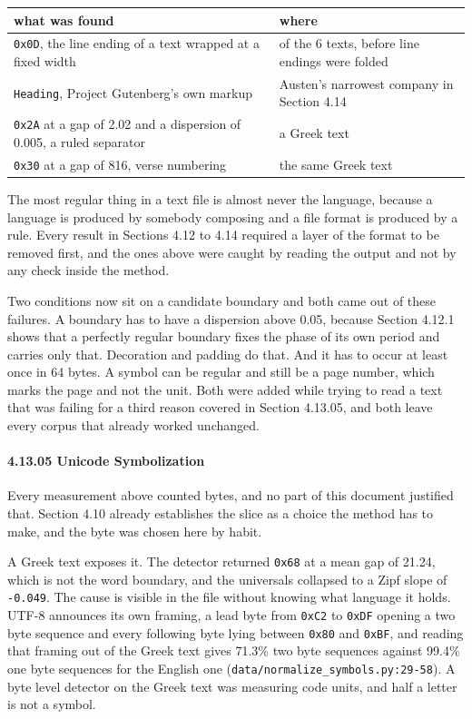 \tiny
\setlength{\tabcolsep}{2pt}
\begin{longtable}{@{}>{\raggedright\arraybackslash}p{}>{\raggedright\arraybackslash}p{}@{}}
\toprule
what was found & where \\
\midrule
\texttt{0x0D}, the line ending of a text wrapped at a fixed width & 5 of the 6 texts, before line endings were folded \\
\texttt{Heading}, Project Gutenberg's own markup & Austen's narrowest company in Section 4.14 \\
\texttt{0x2A} at a gap of 2.02 and a dispersion of 0.005, a ruled separator & a Greek text \\
\texttt{0x30} at a gap of 816, verse numbering & the same Greek text \\
\bottomrule
\end{longtable}
\normalsize

The most regular thing in a text file is almost never the language, because a language is produced by somebody composing and a file format is produced by a rule. Every result in Sections 4.12 to 4.14 required a layer of the format to be removed first, and the ones above were caught by reading the output and not by any check inside the method.

Two conditions now sit on a candidate boundary and both came out of these failures. A boundary has to have a dispersion above 0.05, because Section 4.12.1 shows that a perfectly regular boundary fixes the phase of its own period and carries only that. Decoration and padding do that. And it has to occur at least once in 64 bytes. A symbol can be regular and still be a page number, which marks the page and not the unit. Both were added while trying to read a text that was failing for a third reason covered in Section 4.13.05, and both leave every corpus that already worked unchanged.

\paragraph{4.13.05 Unicode Symbolization}

Every measurement above counted bytes, and no part of this document justified that. Section 4.10 already establishes the slice as a choice the method has to make, and the byte was chosen here by habit.

A Greek text exposes it. The detector returned \texttt{0x68} at a mean gap of 21.24, which is not the word boundary, and the universals collapsed to a Zipf slope of \texttt{-\allowbreak{}0.\allowbreak{}049}. The cause is visible in the file without knowing what language it holds. UTF-8 announces its own framing, a lead byte from \texttt{0x\allowbreak{}C2} to \texttt{0x\allowbreak{}DF} opening a two byte sequence and every following byte lying between \texttt{0x80} and \texttt{0x\allowbreak{}BF}, and reading that framing out of the Greek text gives 71.3\% two byte sequences against 99.4\% one byte sequences for the English one (\texttt{data/\allowbreak{}normalize\_\allowbreak{}symbols.\allowbreak{}py:29-\allowbreak{}58}). A byte level detector on the Greek text was measuring code units, and half a letter is not a symbol.

